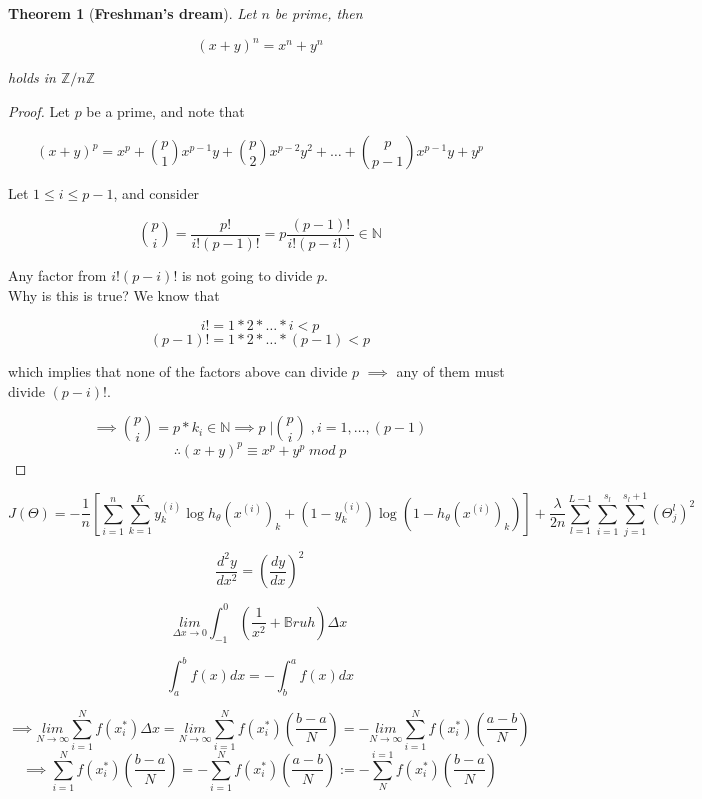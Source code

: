\documentclass[12pt a]{article}
\newtheorem{theorem}{Theorem}
\theoremstyle{definition}
\theoremstyle{definition}
\theoremstyle{definition}
\begin{document}
{\newpage

\begin{theorem}[\textbf{Freshman's dream}]
Let $n$ be prime, then 

$$
(x+y)^{n} = x^{n} + y^{n} 
$$ 

holds in $\mathbb{Z}/n \mathbb{Z}$
\end{theorem}

\begin{proof}
Let $p$ be a prime, and note that 

$$
(x+y)^{p} = 
x^{p} + {p \choose 1}x^{p-1}y + {p \choose 2}x^{p-2}y^{2} + \dots  +  {p \choose p-1}x^{p-1}y + y^{p}
$$

Let $1 \leq i \leq p-1$, and consider 

$$
{p \choose i } = \frac{p!}{i!(p-1)!} = p \frac{(p-1)!}{i! (p-i!)} \in \mathbb{N}
$$

\noindent
Any factor from $i!(p-i)!$ is not going to divide $p$. \\
Why is this is true? We know that 

$$
i!=1*2*\dots*i <p
$$
$$
(p-1)!=1*2*\dots*(p-1) <p
$$

\noindent
which implies that none of the factors above can divide $p$ $\implies$ any of them must divide $(p-i)!$. 

$$
\implies {p\choose i} = p*k_i \in \mathbb{N} 
\implies p\;|{p\choose i} \;, i=1,\dots,(p-1)
$$
$$
\therefore (x+y)^p \equiv x^p + y^p \; mod \; p
$$

\end{proof}


$$
J(\Theta) 
=
-\frac{1}{n} \left[ \sum_{i=1}^{n} \sum_{k=1}^{K} y_{k}^{(i)} \log h_{\theta}(x^{(i)})_{k} 
+ (1 - y_{k}^{(i)}) \log (1 - h_{\theta}(x^{(i)})_{k} ) \right] 
+ 
\frac{\lambda}{2n} \sum_{l=1}^{L-1} \sum_{i=1}^{s_l} \sum_{j=1} ^{s_l + 1} (\Theta_{j}^{l})^{2}
$$


$$
\frac{d^2 y}{dx^2} = \left( \frac{dy}{dx} \right)^2
$$


$$
\underset{\Delta x \rightarrow 0}{lim} \int_{-1}^{0} \left( \frac{1}{x^2} + \mathbb{B}ruh \right) \Delta x 
$$


\newpage

$$
\int_{a}^{b}f(x)dx = -\int_{b}^{a}f(x)dx 
$$

$$
\implies 
\underset{N \rightarrow \infty }{lim} \sum_{i=1}^{N} f(x_{i}^{*}) \Delta x
= 
\underset{N \rightarrow \infty }{lim} \sum_{i=1}^{N} f(x_{i}^{*}) \left(\frac{b-a}{N}\right) 
= 
-\underset{N \rightarrow \infty }{lim} \sum_{i=1}^{N} f(x_{i}^{*}) \left(\frac{a-b}{N}\right) 
$$
$$
\implies 
\sum_{i=1}^{N} f(x_{i}^{*}) \left(\frac{b-a}{N}\right) 
= 
- \sum_{i=1}^{N} f(x_{i}^{*}) \left(\frac{a-b}{N}\right) 
:= 
- \sum_{N}^{i=1} f(x_{i}^{*}) \left(\frac{b-a}{N}\right)
$$


}
\end{document}
